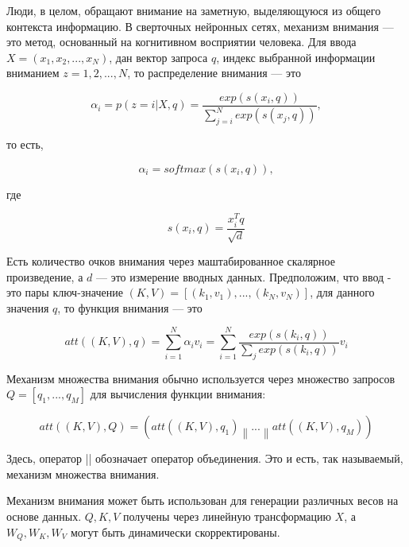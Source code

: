Люди, в целом, обращают внимание на заметную, выделяющуюся из общего контекста информацию. В сверточных нейронных сетях, механизм внимания --- это метод, основанный на когнитивном восприятии человека. Для ввода \(X = (x_{1}, x_{2}, ..., x_{N})\), дан вектор запроса \(q\), индекс выбранной информации вниманием \(z = 1, 2, ..., N\), то распределение внимания --- это

\begin{equation}
    \label{eq:alpha-i}
    \alpha_{i} = p(z=i|X, q) = \frac{exp(s(x_{i}, q))}{\sum_{j=i}^{N}exp(s(x_{j}, q))}, 
\end{equation}

то есть,

\begin{equation}
    \label{eq:alpha-i-softmax}
    \alpha_{i} = softmax(s(x_{i}, q)), 
\end{equation}

где

\begin{equation}
    \label{eq:s-xi-q}
    s(x_{i}, q) = \frac{x_{i}^{T}q}{\sqrt{d}}
\end{equation}

\newpage

Есть количество очков внимания через маштабированное скалярное произведение, а \(d\) --- это измерение вводных данных. Предположим, что ввод - это пары ключ-значение \((K,V) = [(k_{1}, v_{1}), ..., (k_{N}, v_{N})] \), для данного значения \(q\), то функция внимания --- это

\begin{equation}
    \label{eq:att-k-v}
    att((K,V),q) = \sum_{i=1}^{N}\alpha_{i}v_{i} = \sum_{i=1}^{N}\frac{exp(s(k_{i},q))}{\sum_{j}exp(s(k_{i},q))}v_{i}
\end{equation}

Механизм множества внимания обычно используется через множество запросов \(Q = [q_{1}, ..., q_{M}]\) для вычисления функции внимания:

\begin{equation}
    \label{eq:att-k-v-q}
    att((K,V),Q) = (att((K,V),q_{1})\left \| ... \right \|att((K,V),q_{M}))
\end{equation}

Здесь, оператор || обозначает оператор объединения. Это и есть, так называемый, механизм множества внимания.

Механизм внимания может быть использован для генерации различных весов на основе данных. \(Q, K, V\) получены через линейную трансформацию \(X\), а \(W_{Q}, W_{K}, W_{V}\) могут быть динамически скорректированы. 


